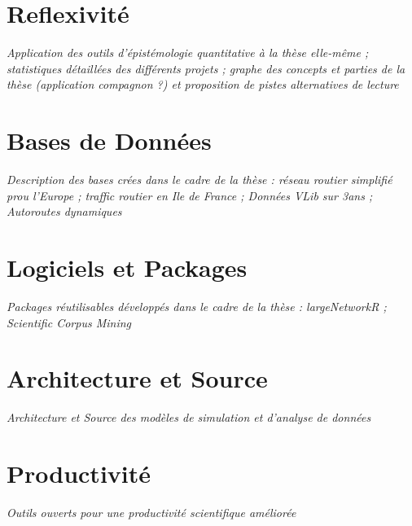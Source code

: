 \section{Reflexivité}


\textit{Application des outils d'épistémologie quantitative à la thèse elle-même ; statistiques détaillées des différents projets ; graphe des concepts et parties de la thèse (application compagnon ?) et proposition de pistes alternatives de lecture}


\section{Bases de Données}


\textit{Description des bases crées dans le cadre de la thèse : réseau routier simplifié prou l'Europe ; traffic routier en Ile de France ; Données VLib sur 3ans ; Autoroutes dynamiques} 


\section{Logiciels et Packages}

\textit{Packages réutilisables développés dans le cadre de la thèse : largeNetworkR ; Scientific Corpus Mining}


\section{Architecture et Source}

\textit{Architecture et Source des modèles de simulation et d'analyse de données}


\section{Productivité}

\textit{Outils ouverts pour une productivité scientifique améliorée}
















